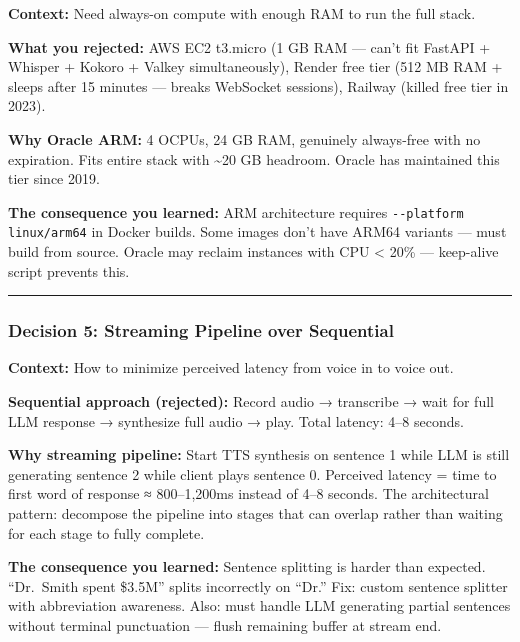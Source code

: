 \documentclass[
  11pt,
]{article}
\newcommand{\passthrough}[1]{#1}
\begin{document}
\textbf{Context:} Need always-on compute with enough RAM to run the full
stack.

\textbf{What you rejected:} AWS EC2 t3.micro (1 GB RAM --- can't fit
FastAPI + Whisper + Kokoro + Valkey simultaneously), Render free tier
(512 MB RAM + sleeps after 15 minutes --- breaks WebSocket sessions),
Railway (killed free tier in 2023).

\textbf{Why Oracle ARM:} 4 OCPUs, 24 GB RAM, genuinely always-free with
no expiration. Fits entire stack with \textasciitilde20 GB headroom.
Oracle has maintained this tier since 2019.

\textbf{The consequence you learned:} ARM architecture requires
\passthrough{\lstinline!--platform linux/arm64!} in Docker builds. Some
images don't have ARM64 variants --- must build from source. Oracle may
reclaim instances with CPU \textless{} 20\% --- keep-alive script
prevents this.

\begin{center}\rule{0.5\linewidth}{0.5pt}\end{center}

\hypertarget{decision-5-streaming-pipeline-over-sequential}{%
\subsubsection{Decision 5: Streaming Pipeline over
Sequential}\label{decision-5-streaming-pipeline-over-sequential}}

\textbf{Context:} How to minimize perceived latency from voice in to
voice out.

\textbf{Sequential approach (rejected):} Record audio → transcribe →
wait for full LLM response → synthesize full audio → play. Total
latency: 4--8 seconds.

\textbf{Why streaming pipeline:} Start TTS synthesis on sentence 1 while
LLM is still generating sentence 2 while client plays sentence 0.
Perceived latency = time to first word of response ≈ 800--1,200ms
instead of 4--8 seconds. The architectural pattern: decompose the
pipeline into stages that can overlap rather than waiting for each stage
to fully complete.

\textbf{The consequence you learned:} Sentence splitting is harder than
expected. ``Dr.~Smith spent \$3.5M'' splits incorrectly on ``Dr.'' Fix:
custom sentence splitter with abbreviation awareness. Also: must handle
LLM generating partial sentences without terminal punctuation --- flush
remaining buffer at stream end.
\end{document}
